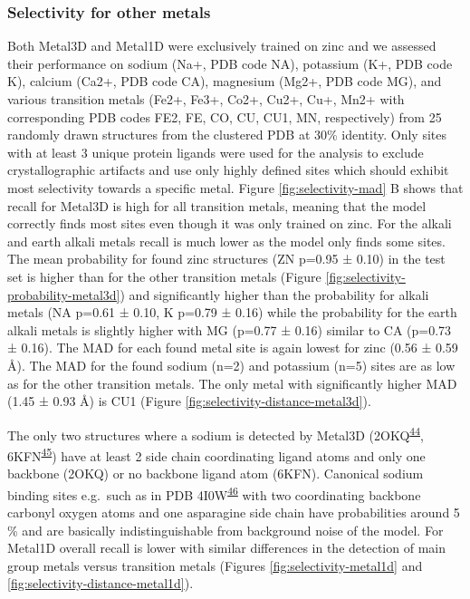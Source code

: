 \documentclass[  ASAPversion,
  ,
  9pt]{elife}
\begin{document}
\hypertarget{selectivity-for-other-metals}{%
\subsubsection{Selectivity for other metals}\label{selectivity-for-other-metals}}

Both Metal3D and Metal1D were exclusively trained on zinc and we assessed their performance on sodium (Na+, PDB code NA), potassium (K+, PDB code K), calcium (Ca2+, PDB code CA), magnesium (Mg2+, PDB code MG), and various transition metals (Fe2+, Fe3+, Co2+, Cu2+, Cu+, Mn2+ with corresponding PDB codes FE2, FE, CO, CU, CU1, MN, respectively) from 25 randomly drawn structures from the clustered PDB at 30\% identity. Only sites with at least 3 unique protein ligands were used for the analysis to exclude crystallographic artifacts and use only highly defined sites which should exhibit most selectivity towards a specific metal. Figure \ref{fig:selectivity-mad} B shows that recall for Metal3D is high for all transition metals, meaning that the model correctly finds most sites even though it was only trained on zinc. For the alkali and earth alkali metals recall is much lower as the model only finds some sites. The mean probability for found zinc structures (ZN p=0.95 ± 0.10) in the test set is higher than for the other transition metals (Figure \ref{fig:selectivity-probability-metal3d}) and significantly higher than the probability for alkali metals (NA p=0.61 ± 0.10, K p=0.79 ± 0.16) while the probability for the earth alkali metals is slightly higher with MG (p=0.77 ± 0.16) similar to CA (p=0.73 ± 0.16). The MAD for each found metal site is again lowest for zinc (0.56 ± 0.59 Å). The MAD for the found sodium (n=2) and potassium (n=5) sites are as low as for the other transition metals. The only metal with significantly higher MAD (1.45 ± 0.93 Å) is CU1 (Figure \ref{fig:selectivity-distance-metal3d}).

The only two structures where a sodium is detected by Metal3D (2OKQ\textsuperscript{\protect\hyperlink{ref-Qubi5dZD}{44}}, 6KFN\textsuperscript{\protect\hyperlink{ref-g7lHXZp5}{45}}) have at least 2 side chain coordinating ligand atoms and only one backbone (2OKQ) or no backbone ligand atom (6KFN). Canonical sodium binding sites e.g.~such as in PDB 4I0W\textsuperscript{\protect\hyperlink{ref-w9ECLZDp}{46}} with two coordinating backbone carbonyl oxygen atoms and one asparagine side chain have probabilities around 5 \% and are basically indistinguishable from background noise of the model.
For Metal1D overall recall is lower with similar differences in the detection of main group metals versus transition metals (Figures \ref{fig:selectivity-metal1d} and \ref{fig:selectivity-distance-metal1d}).
\end{document}
